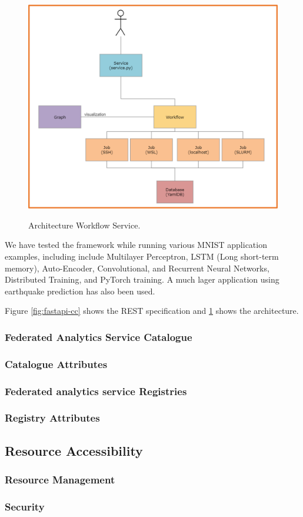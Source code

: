 \begin{figure}[htb]
\centering\includegraphics[width=0.5\columnwidth]{images/workflow-uml.png}
\label{fig:workflow-uml}
\caption{Architecture Workflow Service. }
\end{figure}

We have tested the framework while running various MNIST application examples, including include Multilayer Perceptron, LSTM (Long short-term memory), Auto-Encoder, Convolutional, and Recurrent Neural Networks, Distributed Training, and PyTorch training. 
A much lager application using earthquake prediction has also been used.

Figure \ref{fig:fastapi-cc} shows the REST specification and \ref{fig:workflow-uml} shows the architecture. 

\subsubsection{Federated Analytics Service Catalogue}
\subsubsection{Catalogue Attributes}
\subsubsection{Federated analytics service Registries}
\subsubsection{Registry Attributes}

\subsection{Resource Accessibility}
\subsubsection{Resource Management}
\subsubsection{Security}

